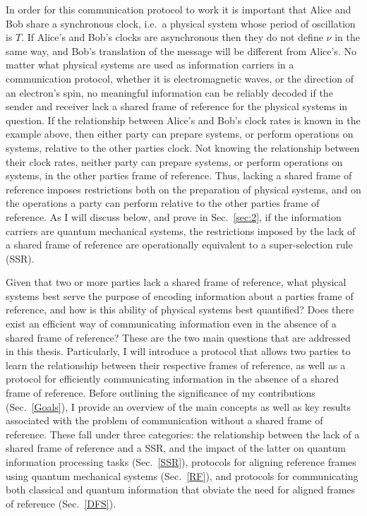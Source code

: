 In order for this communication protocol to work it is important that Alice and Bob share a synchronous clock, i.e.~a physical system whose period of oscillation is $T$.  If Alice's and Bob's clocks are asynchronous then they do not define $\nu$ in the same way, and Bob's translation of the message will be different from Alice's. No matter what physical systems are used as information carriers in a communication protocol, whether it is  electromagnetic waves, or the direction of an electron's spin, no meaningful information can be reliably decoded if the sender and receiver lack a shared frame of reference for the physical systems in question.  If the relationship between Alice's and Bob's clock rates is known in the example above, then either party can prepare systems, or perform operations on systems, relative to the other parties clock.  Not knowing the relationship between their clock rates, neither party can prepare systems, or perform operations on systems, in the other parties frame of reference. Thus, lacking a shared frame of reference imposes restrictions both on the preparation of physical systems, and on the operations a party can perform relative to the other parties frame of reference.  As I will discuss below, and prove in Sec.~\ref{sec:2}, if the information carriers are quantum mechanical systems, the restrictions imposed by the lack of a shared frame of reference are operationally equivalent to a super-selection rule (SSR).  

Given that two or more parties lack a shared frame of reference, what physical systems best serve the purpose of encoding information about a parties frame of reference, and how is this ability of physical systems best quantified?  Does there exist an efficient way of communicating information even in the absence of a shared frame of reference?  These are the two main questions that are addressed in this thesis.  Particularly, I will introduce a protocol that allows two parties to learn the relationship between their respective frames of reference, as well as a protocol for efficiently communicating information in the absence of a shared frame of reference.  Before outlining the significance of my contributions (Sec.~\ref{Goals}), I provide an overview of the main concepts as well as key results associated with the problem of communication without a shared frame of reference.  These fall under three categories: the relationship between the lack of a shared frame of reference and a SSR, and the impact of the latter on quantum information processing tasks (Sec.~\ref{SSR}), protocols for aligning reference frames using quantum mechanical systems (Sec.~\ref{RF}), and protocols for communicating both classical and quantum information that obviate the need for aligned frames of reference (Sec.~\ref{DFS}).


